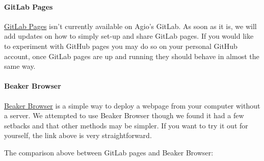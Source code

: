 \documentclass[openany]{article}
\let\oldparagraph\paragraph
\renewcommand{\paragraph}[1]{\oldparagraph{#1}\mbox{}}
\begin{document}
\hypertarget{gitlab-pages}{%
\paragraph{GitLab Pages}\label{gitlab-pages}}

\href{https://about.gitlab.com/product/pages/}{GitLab Pages} isn't currently available on Agio's GitLab. As soon as it is, we will add updates on how to simply set-up and share GitLab pages. If you would like to experiment with GitHub pages you may do so on your personal GitHub account, once GitLab pages are up and running they should behave in almost the same way.

\hypertarget{beaker-browser}{%
\paragraph{Beaker Browser}\label{beaker-browser}}

\href{https://beakerbrowser.com/}{Beaker Browser} is a simple way to deploy a webpage from your computer without a server. We attempted to use Beaker Browser though we found it had a few setbacks and that other methods may be simpler. If you want to try it out for yourself, the link above is very straightforward.

The comparison above between GitLab pages and Beaker Browser:
\end{document}
